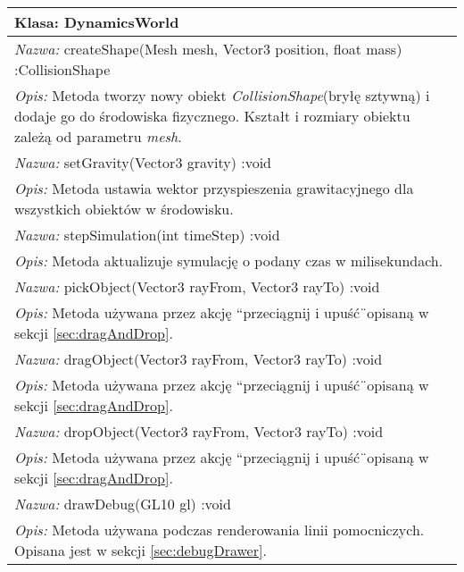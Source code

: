 \begin{tabular}{|p{\textwidth}|}
\hline
\textbf{Klasa: DynamicsWorld}\\ \hline
\emph{Nazwa: } createShape(Mesh mesh, Vector3 position, float mass)
:CollisionShape\\
\emph{Opis: } Metoda tworzy nowy obiekt \emph{CollisionShape}(bryłę sztywną) i
dodaje go do środowiska fizycznego. Kształt i rozmiary obiektu zależą od
parametru \emph{mesh}.\\
\hline
\emph{Nazwa: } setGravity(Vector3 gravity) :void\\
\emph{Opis: } Metoda ustawia wektor przyspieszenia grawitacyjnego dla wszystkich
obiektów w środowisku.\\
\hline
\emph{Nazwa: } stepSimulation(int timeStep) :void\\
\emph{Opis: } Metoda aktualizuje symulację o podany czas w milisekundach.\\
\hline
\emph{Nazwa: } pickObject(Vector3 rayFrom, Vector3 rayTo) :void\\
\emph{Opis: } Metoda używana przez akcję ``przeciągnij i upuść\"\ opisaną w
sekcji \ref{sec:dragAndDrop}.\\
\hline
\emph{Nazwa: } dragObject(Vector3 rayFrom, Vector3 rayTo) :void\\
\emph{Opis: } Metoda używana przez akcję ``przeciągnij i upuść\"\ opisaną w
sekcji \ref{sec:dragAndDrop}.\\
\hline
\emph{Nazwa: } dropObject(Vector3 rayFrom, Vector3 rayTo) :void\\
\emph{Opis: } Metoda używana przez akcję ``przeciągnij i upuść\"\ opisaną w
sekcji \ref{sec:dragAndDrop}.\\
\hline
\emph{Nazwa: } drawDebug(GL10 gl) :void\\
\emph{Opis: } Metoda używana podczas renderowania linii pomocniczych. Opisana
jest w sekcji \ref{sec:debugDrawer}.\\
\hline
\end{tabular}